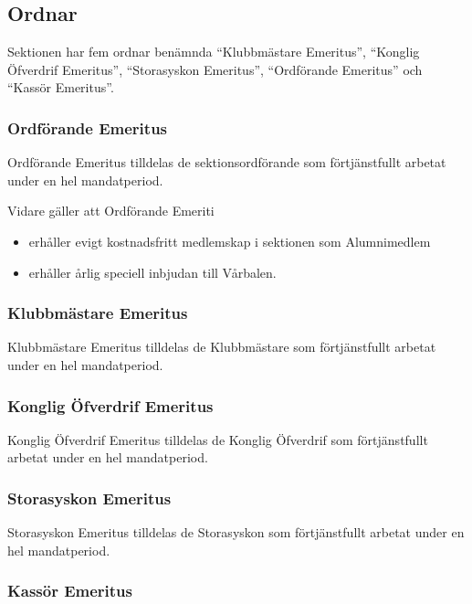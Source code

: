 \documentclass{dgovdoc}
\begin{document}
\subsection{Ordnar}

Sektionen har fem ordnar benämnda ``Klubbmästare Emeritus'', ``Konglig
Öfverdrif Emeritus'', ``Storasyskon Emeritus'', ``Ordförande Emeritus'' och ``Kassör Emeritus''.

\subsubsection{Ordförande Emeritus}

Ordförande Emeritus tilldelas de sektionsordförande som förtjänstfullt arbetat
under en hel mandatperiod.

Vidare gäller att Ordförande Emeriti

\begin{itemize}
  \item erhåller evigt kostnadsfritt medlemskap i sektionen som Alumnimedlem
  \item erhåller årlig speciell inbjudan till Vårbalen.
\end{itemize}

\subsubsection{Klubbmästare Emeritus}

Klubbmästare Emeritus tilldelas de Klubbmästare som förtjänstfullt arbetat
under en hel mandatperiod.

\subsubsection{Konglig Öfverdrif Emeritus}

Konglig Öfverdrif Emeritus tilldelas de Konglig Öfverdrif som förtjänstfullt
arbetat under en hel mandatperiod.

\subsubsection{Storasyskon Emeritus}

Storasyskon Emeritus tilldelas de Storasyskon som förtjänstfullt arbetat under
en hel mandatperiod.

\subsubsection{Kassör Emeritus}
\end{document}
